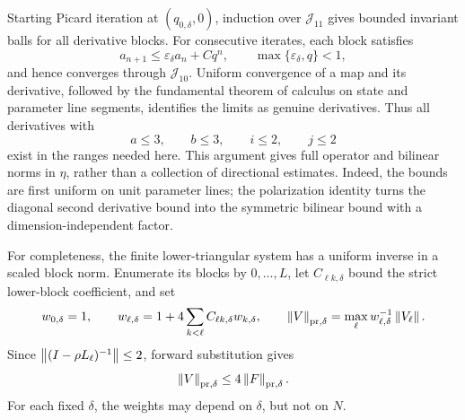 Starting Picard iteration at \((q_{0,\delta},0)\), induction over
\(\mathcal J_{11}\) gives bounded invariant balls for all derivative
blocks.  For consecutive iterates, each block satisfies
\begin{equation}
 a_{n+1}\le\varepsilon_\delta a_n+Cq^n,
 \qquad \max\{\varepsilon_\delta,q\}<1,
 \label{eq:supp-jet-recurrence}
\end{equation}
and hence converges through \(\mathcal J_{10}\).  Uniform convergence of a
map and its derivative, followed by the fundamental theorem of calculus on
state and parameter line segments, identifies the limits as genuine
derivatives.  Thus all derivatives with
\begin{equation}
 a\le3,\qquad b\le3,\qquad i\le2,\qquad j\le2
 \label{eq:supp-required-derivatives}
\end{equation}
exist in the ranges needed here.  This argument gives full operator and
bilinear norms in \(\eta\), rather than a collection of directional
estimates.  Indeed, the bounds are first uniform on unit parameter lines;
the polarization identity turns the diagonal second derivative bound into
the symmetric bilinear bound with a dimension-independent factor.

For completeness, the finite lower-triangular system has a uniform inverse
in a scaled block norm.  Enumerate its blocks by \(0,\ldots,L\), let
\(C_{\ell k,\delta}\) bound the strict lower-block coefficient, and set
\begin{equation}
 w_{0,\delta}=1,\qquad
 w_{\ell,\delta}=1+4\sum_{k<\ell}C_{\ell k,\delta}w_{k,\delta},\qquad
 \left\lVert V\right\rVert_{\rm pr,\delta}
 =\max_\ell w_{\ell,\delta}^{-1}\left\lVert V_\ell\right\rVert.
 \label{eq:supp-prolonged-norm}
\end{equation}
Since \(\left\lVert(I-\rho L_\ell)^{-1}\right\rVert\le2\), forward substitution gives
\begin{equation}
 \left\lVert V\right\rVert_{\rm pr,\delta}\le4\left\lVert F\right\rVert_{\rm pr,\delta}.
 \label{eq:supp-prolonged-inverse}
\end{equation}
For each fixed \(\delta\), the weights may depend on \(\delta\), but not on
\(N\).

